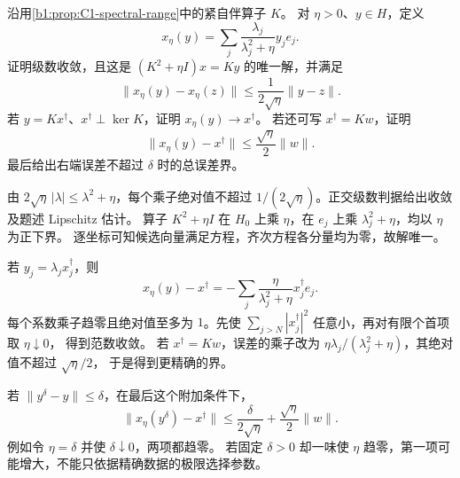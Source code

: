 \begin{exercise}\label{b1:ex:C1-spectral-regularization}
沿用\cref{b1:prop:C1-spectral-range}中的紧自伴算子 \(K\)。
对 \(\eta>0\)、\(y\in H\)，定义
\[
 x_\eta(y)=\sum_j\frac{\lambda_j}{\lambda_j^2+\eta}y_je_j.
\]
证明级数收敛，且这是 \((K^2+\eta I)x=Ky\) 的唯一解，并满足
\[
 \|x_\eta(y)-x_\eta(z)\|\leq\frac1{2\sqrt\eta}\|y-z\|.
\]
若 \(y=Kx^\dagger\)、\(x^\dagger\perp\ker K\)，证明 \(x_\eta(y)\to x^\dagger\)。
若还可写 \(x^\dagger=Kw\)，证明
\[
 \|x_\eta(y)-x^\dagger\|\leq\frac{\sqrt\eta}{2}\|w\|.
\]
最后给出右端误差不超过 \(\delta\) 时的总误差界。
\end{exercise}
\begin{solution}
由 \(2\sqrt\eta\,|\lambda|\leq\lambda^2+\eta\)，每个乘子绝对值不超过
\(1/(2\sqrt\eta)\)。正交级数判据给出收敛及题述 Lipschitz 估计。
算子 \(K^2+\eta I\) 在 \(H_0\) 上乘 \(\eta\)，在 \(e_j\) 上乘
\(\lambda_j^2+\eta\)，均以 \(\eta\) 为正下界。
逐坐标可知候选向量满足方程，齐次方程各分量均为零，故解唯一。

若 \(y_j=\lambda_jx^\dagger_j\)，则
\[
 x_\eta(y)-x^\dagger
 =-\sum_j\frac{\eta}{\lambda_j^2+\eta}x^\dagger_je_j.
\]
每个系数乘子趋零且绝对值至多为 \(1\)。先使
\(\sum_{j>N}|x^\dagger_j|^2\) 任意小，再对有限个首项取 \(\eta\downarrow0\)，
得到范数收敛。
若 \(x^\dagger=Kw\)，误差的乘子改为
\(\eta\lambda_j/(\lambda_j^2+\eta)\)，其绝对值不超过 \(\sqrt\eta/2\)，
于是得到更精确的界。

若 \(\|y^\delta-y\|\leq\delta\)，在最后这个附加条件下，
\[
 \|x_\eta(y^\delta)-x^\dagger\|
 \leq\frac{\delta}{2\sqrt\eta}+\frac{\sqrt\eta}{2}\|w\|.
\]
例如令 \(\eta=\delta\) 并使 \(\delta\downarrow0\)，两项都趋零。
若固定 \(\delta>0\) 却一味使 \(\eta\) 趋零，第一项可能增大，不能只依据精确数据的极限选择参数。
\end{solution}

